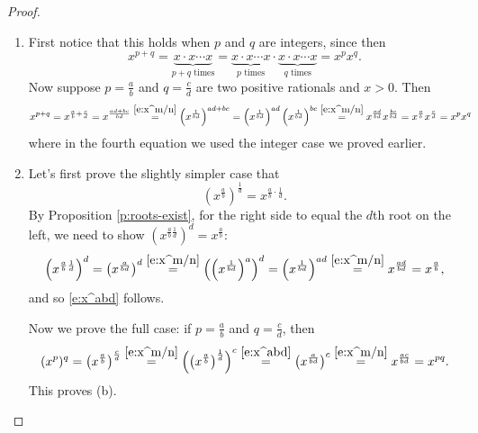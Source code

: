 \documentclass[11pt,dvipsnames]{book}
\numberwithin{figure}{section} %
\numberwithin{table}{section} %
\begin{document}
\begin{proof}
\begin{enumerate}[label=(\alph*)]
\item First notice that this holds when $p$ and $q$ are integers, since then
\[
x^{p+q}=\underbrace{x\cdot x\cdots x}_{\mbox{$p+q$ times}}
=\underbrace{x\cdot x\cdots x}_{\mbox{$p$ times}}\cdot \underbrace{x\cdot x\cdots x}_{\mbox{$q$ times}} = x^{p}x^{q}.
\]
Now suppose $p=\frac{a}{b}$ and $q=\frac{c}{d}$ are two positive rationals and $x>0$. Then
\begin{align*}
x^{p+q}
& =x^{\frac{a}{b}+\frac{c}{d}}
=x^{\frac{ad+bc}{bd}}
\stackrel{\eqref{e:x^m/n}}{=} \left(x^{\frac{1}{bd}}\right)^{ad+bc}
=\left(x^{\frac{1}{bd}}\right)^{ad}\left(x^{\frac{1}{bd}}\right)^{bc}
\stackrel{\eqref{e:x^m/n}}{=}x^{\frac{ad}{bd}}x^{\frac{bc}{bd}}=x^{\frac{a}{b}}x^{\frac{c}{d}}=x^{p}x^{q}
\end{align*}
where in the fourth equation we used the integer case we proved earlier.
\item

Let's first prove the slightly simpler case that
\begin{equation}
\label{e:x^abd}
\left(x^{\frac{a}{b}}\right)^{\frac{1}{d}}=x^{\frac{a}{b}\cdot\frac{1}{d}}.
\end{equation}
By Proposition \ref{p:roots-exist}, for the right side to equal the $d$th root on the left, we need to show $(x^{\frac{a}{b}\frac{1}{d}})^{d} = x^{\frac{a}{b}}$:
\[
\left(x^{\frac{a}{b}\frac{1}{d}}\right)^{d} =\left(x^{\frac{a}{bd}}\right)^{d}
\stackrel{\eqref{e:x^m/n}}{=}
\left(\left(x^{\frac{1}{bd}}\right)^{a}\right)^{d}
=\left(x^{\frac{1}{bd}}\right)^{ad}
\stackrel{\eqref{e:x^m/n}}{=}x^{\frac{ad}{bd}}=x^{\frac{a}{b}},
\]
and so \eqref{e:x^abd} follows.

Now we prove the full case: if $p=\frac{a}{b}$ and $q=\frac{c}{d}$, then
\[
(x^{p})^{q} = \left(x^{\frac{a}{b}}\right)^{\frac{c}{d}}
\stackrel{\eqref{e:x^m/n}}{=}\left( \left(x^{\frac{a}{b}}\right)^{\frac{1}{d}}\right)^{c}
\stackrel{\eqref{e:x^abd}}{=}\left(x^{\frac{a}{bd}}\right)^{c}
\stackrel{\eqref{e:x^m/n}}{=} x^{\frac{ac}{bd}}=x^{pq}.
\]
This proves (b).


\end{enumerate}
\end{proof}
\end{document}
